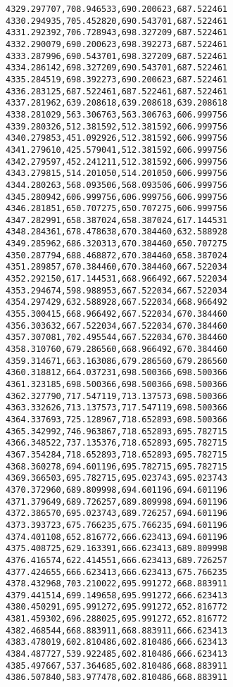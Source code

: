 \documentclass[11pt]{article}
\begin{document}
\begin{Verbatim}[commandchars=\\\{\}]
4329.297707,708.946533,690.200623,687.522461
4330.294935,705.452820,690.543701,687.522461
4331.292392,706.728943,698.327209,687.522461
4332.290079,690.200623,698.392273,687.522461
4333.287996,690.543701,698.327209,687.522461
4334.286142,698.327209,690.543701,687.522461
4335.284519,698.392273,690.200623,687.522461
4336.283125,687.522461,687.522461,687.522461
4337.281962,639.208618,639.208618,639.208618
4338.281029,563.306763,563.306763,606.999756
4339.280326,512.381592,512.381592,606.999756
4340.279853,451.092926,512.381592,606.999756
4341.279610,425.579041,512.381592,606.999756
4342.279597,452.241211,512.381592,606.999756
4343.279815,514.201050,514.201050,606.999756
4344.280263,568.093506,568.093506,606.999756
4345.280942,606.999756,606.999756,606.999756
4346.281851,650.707275,650.707275,606.999756
4347.282991,658.387024,658.387024,617.144531
4348.284361,678.478638,670.384460,632.588928
4349.285962,686.320313,670.384460,650.707275
4350.287794,688.468872,670.384460,658.387024
4351.289857,670.384460,670.384460,667.522034
4352.292150,617.144531,668.966492,667.522034
4353.294674,598.988953,667.522034,667.522034
4354.297429,632.588928,667.522034,668.966492
4355.300415,668.966492,667.522034,670.384460
4356.303632,667.522034,667.522034,670.384460
4357.307081,702.495544,667.522034,670.384460
4358.310760,679.286560,668.966492,670.384460
4359.314671,663.163086,679.286560,679.286560
4360.318812,664.037231,698.500366,698.500366
4361.323185,698.500366,698.500366,698.500366
4362.327790,717.547119,713.137573,698.500366
4363.332626,713.137573,717.547119,698.500366
4364.337693,725.128967,718.652893,698.500366
4365.342992,746.963867,718.652893,695.782715
4366.348522,737.135376,718.652893,695.782715
4367.354284,718.652893,718.652893,695.782715
4368.360278,694.601196,695.782715,695.782715
4369.366503,695.782715,695.023743,695.023743
4370.372960,689.809998,694.601196,694.601196
4371.379649,689.726257,689.809998,694.601196
4372.386570,695.023743,689.726257,694.601196
4373.393723,675.766235,675.766235,694.601196
4374.401108,652.816772,666.623413,694.601196
4375.408725,629.163391,666.623413,689.809998
4376.416574,622.414551,666.623413,689.726257
4377.424655,666.623413,666.623413,675.766235
4378.432968,703.210022,695.991272,668.883911
4379.441514,699.149658,695.991272,666.623413
4380.450291,695.991272,695.991272,652.816772
4381.459302,696.288025,695.991272,652.816772
4382.468544,668.883911,668.883911,666.623413
4383.478019,602.810486,602.810486,666.623413
4384.487727,539.922485,602.810486,666.623413
4385.497667,537.364685,602.810486,668.883911
4386.507840,583.977478,602.810486,668.883911

\end{Verbatim}
\end{document}
